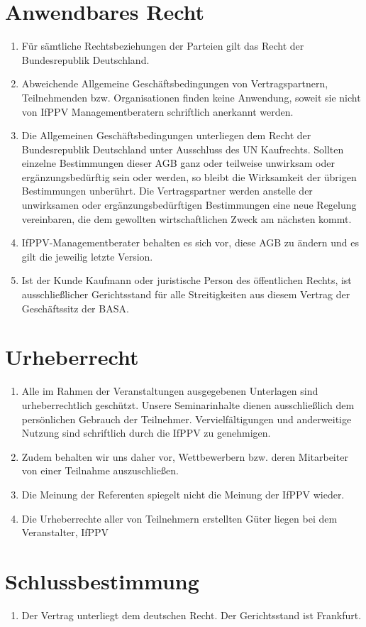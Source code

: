 \documentclass[a4paper, 12pt]{scrartcl}
\begin{document}
    \section{Anwendbares Recht}
    \begin{enumerate}
        \item F\"ur s\"amtliche Rechtsbeziehungen der Parteien gilt das Recht der Bundesrepublik Deutschland.

        \item Abweichende Allgemeine Gesch\"aftsbedingungen von Vertragspartnern, Teilnehmenden bzw. Organisationen finden keine Anwendung, soweit sie nicht von IfPPV Managementberatern schriftlich anerkannt werden.

        \item Die Allgemeinen Gesch\"aftsbedingungen unterliegen dem Recht der Bundesrepublik Deutschland unter Ausschluss des UN Kaufrechts.
        Sollten einzelne Bestimmungen dieser AGB ganz oder teilweise unwirksam oder erg\"anzungsbed\"urftig sein oder werden, so bleibt die Wirksamkeit der \"ubrigen Bestimmungen unber\"uhrt.
        Die Vertragspartner werden anstelle der unwirksamen oder erg\"anzungsbed\"urftigen Bestimmungen eine neue Regelung vereinbaren, die dem gewollten wirtschaftlichen Zweck am n\"achsten kommt.

        \item IfPPV-Managementberater behalten es sich vor, diese AGB zu \"andern und es gilt die jeweilig letzte Version.

        \item Ist der Kunde Kaufmann oder juristische Person des \"offentlichen Rechts, ist ausschließlicher Gerichtsstand f\"ur alle Streitigkeiten aus diesem Vertrag der Gesch\"aftssitz der BASA.
    \end{enumerate}

    \section{Urheberrecht}
    \begin{enumerate}
	\item Alle im Rahmen der Veranstaltungen ausgegebenen Unterlagen sind urheberrechtlich geschützt. Unsere Seminarinhalte dienen ausschließlich dem persönlichen Gebrauch der Teilnehmer. Vervielfältigungen und anderweitige Nutzung sind schriftlich durch die IfPPV zu genehmigen.
	\item Zudem behalten wir uns daher vor, Wettbewerbern bzw. deren Mitarbeiter von einer Teilnahme auszuschließen.
	\item Die Meinung der Referenten spiegelt nicht die Meinung der IfPPV wieder.
	\item Die Urheberrechte aller von Teilnehmern erstellten G\"uter liegen bei dem Veranstalter, IfPPV
    \end{enumerate}
    \section{Schlussbestimmung}
    \begin{enumerate}
	\item Der Vertrag unterliegt dem deutschen Recht. Der Gerichtsstand ist Frankfurt.
    \end{enumerate}
    \newpage
    

    \newpage
    
\end{document}
